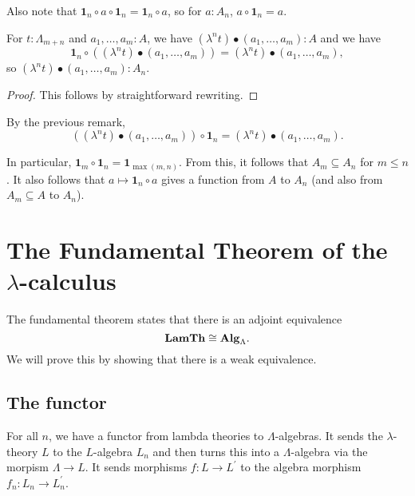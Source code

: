\begin{remark}
  Also note that $ \mathbf 1_n \circ a \circ \mathbf 1_n = \mathbf 1_n \circ a $, so for $ a : A_n $, $ a \circ \mathbf 1_n = a $.
\end{remark}

\begin{lemma}
  For $ t: \Lambda_{m + n} $ and $ a_1, \dots, a_m: A $, we have $ (\lambda^n t) \bullet (a_1, \dots, a_m) : A $ and we have
  \[ \mathbf 1_n \circ ((\lambda^n t) \bullet (a_1, \dots, a_m)) = (\lambda^n t) \bullet (a_1, \dots, a_m), \]
  so $ (\lambda^n t) \bullet (a_1, \dots, a_m) : A_n $.
\end{lemma}
\begin{proof}
  This follows by straightforward rewriting.
\end{proof}

\begin{corollary}
  By the previous remark,
  \[ ((\lambda^n t) \bullet (a_1, \dots, a_m)) \circ \mathbf 1_n = (\lambda^n t) \bullet (a_1, \dots, a_m). \]
\end{corollary}
\begin{corollary}
  In particular, $ \mathbf 1_m \circ \mathbf 1_n = \mathbf 1_{\max(m, n)} $. From this, it follows that $ A_m \subseteq A_n $ for $ m \leq n $. It also follows that $ a \mapsto \mathbf 1_n \circ a $ gives a function from $ A $ to $ A_n $ (and also from $ A_m \subseteq A $ to $ A_n $).
\end{corollary}


\section{The Fundamental Theorem of the \texorpdfstring{$ \lambda $-}{lambda }calculus}

The fundamental theorem states that there is an adjoint equivalence
\[ \mathbf{LamTh} \cong \mathbf{Alg}_{\Lambda}. \]
We will prove this by showing that there is a weak equivalence.


\subsection{The functor}

\begin{definition}
  For all $ n $, we have a functor from lambda theories to $ \Lambda $-algebras. It sends the $ \lambda $-theory $ L $ to the $ L $-algebra $ L_n $ and then turns this into a $ \Lambda $-algebra via the morpism $ \Lambda \to L $. It sends morphisms $ f: L \to L^\prime $ to the algebra morphism $ f_n : L_n \to L^\prime_n $.
\end{definition}


